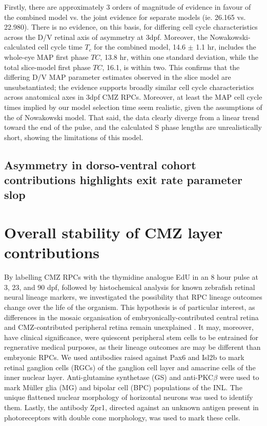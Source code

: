 Firstly, there are approximately 3 orders of magnitude of evidence in favour of the combined model vs. the joint evidence for separate models (ie. 26.165 vs. 22.980). There is no evidence, on this basis, for differing cell cycle characteristics across the D/V retinal axis of asymmetry at 3dpf. Moreover, the Nowakowski-calculated cell cycle time $T_c$ for the combined model, 14.6 $\pm$ 1.1 hr, includes the whole-eye MAP first phase $TC$, 13.8 hr, within one standard deviation, while the total slice-model first phase $TC$, 16.1, is within two. This confirms that the differing D/V MAP parameter estimates observed in the slice model are unsubstantiated; the evidence supports broadly similar cell cycle characteristics across anatomical axes in 3dpf CMZ RPCs. Moreover, at least the MAP cell cycle times implied by our model selection time seem realistic, given the assumptions of the of Nowakowski model. That said, the data clearly diverge from a linear trend toward the end of the pulse, and the calculated S phase lengths are unrealistically short, showing the limitations of this model.

\subsection{Asymmetry in dorso-ventral cohort contributions highlights exit rate parameter slop}
\label{sec:exitasym}

\section{Overall stability of CMZ layer contributions }

By labelling CMZ RPCs with the thymidine analogue EdU in an 8 hour pulse at 3, 23, and 90 dpf, followed by histochemical analysis for known zebrafish retinal neural lineage markers, we investigated the possibility that RPC lineage outcomes change over the life of the organism. This hypothesis is of particular interest, as differences in the mosaic organisation of embryonically-contributed central retina and CMZ-contributed peripheral retina remain unexplained \cite{Allison2010}. It may, moreover, have clinical significance, were quiescent peripheral stem cells to be entrained for regnerative medical purposes, as their lineage outcomes are may be different than embryonic RPCs.  We used antibodies raised against Pax6 and Isl2b to mark retinal ganglion cells (RGCs) of the ganglion cell layer and amacrine cells of the inner nuclear layer. Anti-glutamine synthetase (GS) and anti-PKC$\beta$ were used to mark M\"{u}ller glia (MG) and bipolar cell (BPC) populations of the INL. The unique flattened nuclear morphology of horizontal neurons was used to identify them. Lastly, the antibody Zpr1, directed against an unknown antigen present in photoreceptors with double cone morphology, was used to mark these cells.

